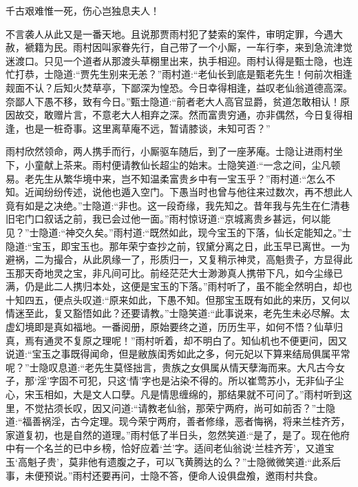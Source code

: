 \begin{poem}
    \begin{pl}
        千古艰难惟一死，伤心岂独息夫人！
    \end{pl}
\end{poem}


\begin{parag}
    不言袭人从此又是一番天地。且说那贾雨村犯了婪索的案件，审明定罪，今遇大赦，褫籍为民。雨村因叫家眷先行，自己带了一个小厮，一车行李，来到急流津觉迷渡口。只见一个道者从那渡头草棚里出来，执手相迎。雨村认得是甄士隐，也连忙打恭，士隐道:“贾先生别来无恙？”雨村道:“老仙长到底是甄老先生！何前次相逢觌面不认？后知火焚草亭，下鄙深为惶恐。今日幸得相逢，益叹老仙翁道德高深。奈鄙人下愚不移，致有今日。”甄士隐道:“前者老大人高官显爵，贫道怎敢相认！原因故交，敢赠片言，不意老大人相弃之深。然而富贵穷通，亦非偶然，今日复得相逢，也是一桩奇事。这里离草庵不远，暂请膝谈，未知可否？”
\end{parag}


\begin{parag}
    雨村欣然领命，两人携手而行，小厮驱车随后，到了一座茅庵。士隐让进雨村坐下，小童献上茶来。雨村便请教仙长超尘的始末。士隐笑道:“一念之间，尘凡顿易。老先生从繁华境中来，岂不知温柔富贵乡中有一宝玉乎？”雨村道:“怎么不知。近闻纷纷传述，说他也遁入空门。下愚当时也曾与他往来过数次，再不想此人竟有如是之决绝。”士隐道:“非也。这一段奇缘，我先知之。昔年我与先生在仁清巷旧宅门口叙话之前，我已会过他一面。”雨村惊讶道:“京城离贵乡甚远，何以能见？”士隐道:“神交久矣。”雨村道:“既然如此，现今宝玉的下落，仙长定能知之。”士隐道:“宝玉，即宝玉也。那年荣宁查抄之前，钗黛分离之日，此玉早已离世。一为避祸，二为撮合，从此夙缘一了，形质归一，又复稍示神灵，高魁贵子，方显得此玉那天奇地灵之宝，非凡间可比。前经茫茫大士渺渺真人携带下凡，如今尘缘已满，仍是此二人携归本处，这便是宝玉的下落。”雨村听了，虽不能全然明白，却也十知四五，便点头叹道:“原来如此，下愚不知。但那宝玉既有如此的来历，又何以情迷至此，复又豁悟如此？还要请教。”士隐笑道:“此事说来，老先生未必尽解。太虚幻境即是真如福地。一番阅册，原始要终之道，历历生平，如何不悟？仙草归真，焉有通灵不复原之理呢！”雨村听着，却不明白了。知仙机也不便更问，因又说道:“宝玉之事既得闻命，但是敝族闺秀如此之多，何元妃以下算来结局俱属平常呢？”士隐叹息道:“老先生莫怪拙言，贵族之女俱属从情天孽海而来。大凡古今女子，那‘淫’字固不可犯，只这‘情’字也是沾染不得的。所以崔莺苏小，无非仙子尘心，宋玉相如，大是文人口孽。凡是情思缠绵的，那结果就不可问了。”雨村听到这里，不觉拈须长叹，因又问道:“请教老仙翁，那荣宁两府，尚可如前否？”士隐道:“福善祸淫，古今定理。现今荣宁两府，善者修缘，恶者悔祸，将来兰桂齐芳，家道复初，也是自然的道理。”雨村低了半日头，忽然笑道:“是了，是了。现在他府中有一个名兰的已中乡榜，恰好应着‘兰’字。适间老仙翁说‘兰桂齐芳’，又道宝玉‘高魁子贵’，莫非他有遗腹之子，可以飞黄腾达的么？”士隐微微笑道:“此系后事，未便预说。”雨村还要再问，士隐不答，便命人设俱盘飧，邀雨村共食。
\end{parag}


